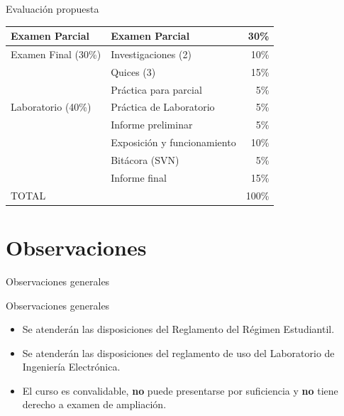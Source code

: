\documentclass[xcolor=dvipsnames,handout]{beamer}
\newcommand{\pageframe}[1]{\frame{\begin{center}{ \Huge #1 }\end{center}}}
\begin{document}
\begin{frame}{Evaluación propuesta}
\begin{center}
\begin{tabular}{|l|l|r|}\hline
	Examen Parcial		& Examen Parcial	& 	30\%\\\hline
	Examen Final (30\%)	& Investigaciones (2)	&	10\%\\\cline{2-3}
				& Quices (3)		&	15\%\\\cline{2-3}
				& Práctica para parcial &	 5\%\\\hline
	Laboratorio (40\%)	& Práctica de Laboratorio	&	 5\%\\\cline{2-3}
				& Informe preliminar	&	 5\%\\\cline{2-3}
				& Exposición y funcionamiento	&	10\%\\\cline{2-3}
				& Bitácora (SVN)	&	 5\%\\\cline{2-3}
				& Informe final		&	15\%\\\hline\hline
	\multicolumn{2}{|l|}{TOTAL}			&	100\%\\\hline
\end{tabular}
\end{center}
\end{frame}
\section{Observaciones}

\pageframe{Observaciones}

\begin{frame}{Observaciones generales}
  \begin{block}{Observaciones generales}
    \begin{itemize}[<+->]
      \item Se atenderán las disposiciones del Reglamento del Régimen Estudiantil.
      \item Se atenderán las disposiciones del reglamento de uso del Laboratorio de Ingeniería Electrónica.
      \item El curso es convalidable, \textbf{no} puede presentarse por suficiencia y \textbf{no} tiene derecho a examen de ampliación.
    \end{itemize}
  \end{block}
\end{frame}
\end{document}
